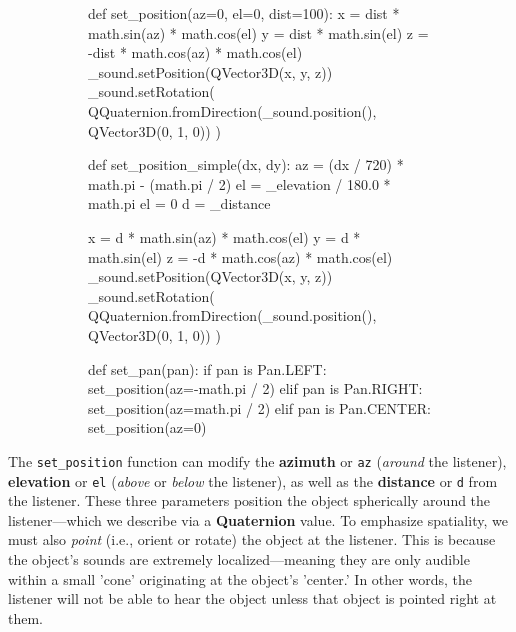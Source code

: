\documentclass{report}
\newcommand{\tech}[1]{\textbf{#1}}
\begin{document}
\begin{figure}
    \centering
    \begin{subfigure}{\textwidth}
        \begin{codeblock}
def set_position(az=0, el=0, dist=100):
    x = dist * math.sin(az) * math.cos(el)
    y = dist * math.sin(el)
    z = -dist * math.cos(az) * math.cos(el)
    _sound.setPosition(QVector3D(x, y, z))
    _sound.setRotation(
        QQuaternion.fromDirection(_sound.position(), QVector3D(0, 1, 0))
    )
\end{codeblock}
    
    \end{subfigure}

    \begin{subfigure}{\textwidth}
        \begin{codeblock}
def set_position_simple(dx, dy):
    az = (dx / 720) * math.pi - (math.pi / 2)
    el = _elevation / 180.0 * math.pi
    el = 0
    d = _distance

    x = d * math.sin(az) * math.cos(el)
    y = d * math.sin(el)
    z = -d * math.cos(az) * math.cos(el)
    _sound.setPosition(QVector3D(x, y, z))
    _sound.setRotation(
        QQuaternion.fromDirection(_sound.position(), QVector3D(0, 1, 0))
    )
\end{codeblock}
    
    \end{subfigure}

    
    \begin{subfigure}{\textwidth}
        \begin{codeblock}
def set_pan(pan):
    if pan is Pan.LEFT:
        set_position(az=-math.pi / 2)
    elif pan is Pan.RIGHT:
        set_position(az=math.pi / 2)
    elif pan is Pan.CENTER:
        set_position(az=0)
\end{codeblock}
    
    \end{subfigure}
    \label{code:audObjFun}
\end{figure}

The \texttt{set\_position} function can modify the \tech{azimuth} or \texttt{az} (\emph{around} the listener), \tech{elevation} or \texttt{el} (\emph{above} or \emph{below} the listener), as well as the \tech{distance} or \texttt{d} from the listener. These three parameters position the object spherically around the listener---which we describe via a \tech{Quaternion} value. To emphasize spatiality, we must also \emph{point} (i.e., orient or rotate) the object at the listener. This is because the object's sounds are extremely localized---meaning they are only audible within a small 'cone' originating at the object's 'center.' In other words, the listener will not be able to hear the object unless that object is pointed right at them. 
\end{document}
